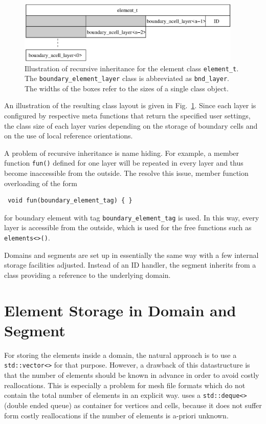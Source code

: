 \begin{figure}[tb]
\centering
 \includegraphics[width=0.95\textwidth]{figures/recursive-inheritance.eps}
 \caption{Illustration of recursive inheritance for the element class \lstinline|element_t|. The \lstinline|boundary_element_layer| class is abbreviated as \lstinline|bnd_layer|. The widths of the boxes refer to the sizes of a single class object.}
 \label{fig:recursive-inheritance}
\end{figure}
An illustration of the resulting class layout is given in Fig.~\ref{fig:recursive-inheritance}.
Since each layer is configured by respective meta functions that return the specified user settings,
the class size of each layer varies depending on the storage of boundary cells and on the use of local reference orientations.

A problem of recursive inheritance is name hiding. For example, a member function \lstinline|fun()| defined for one layer
will be repeated in every layer and thus become inaccessible from the outside. The resolve this issue, member function overloading of the form
\begin{lstlisting}
 void fun(boundary_element_tag) { }
\end{lstlisting}
for boundary element with tag \lstinline|boundary_element_tag| is used. In this way, every layer is accessible from the outside, which is used for the free functions such as \lstinline|elements<>()|.

Domains and segments are set up in essentially the same way with a few internal storage facilities adjusted.
Instead of an ID handler, the segment inherits from a class providing a reference to the underlying domain.

\section{Element Storage in Domain and Segment}
For storing the elements inside a domain, the natural approach is to use a \lstinline|std::vector<>| for that purpose.
However, a drawback of this datastructure is that the number of elements should be known in advance in order to avoid
costly reallocations. This is especially a problem for mesh file formats which do not contain the total number of elements in an explicit way.
{\ViennaGrid} uses a \lstinline|std::deque<>| (double ended queue) as container for vertices and cells, because it does not suffer form costly reallocations
if the number of elements is a-priori unknown.

